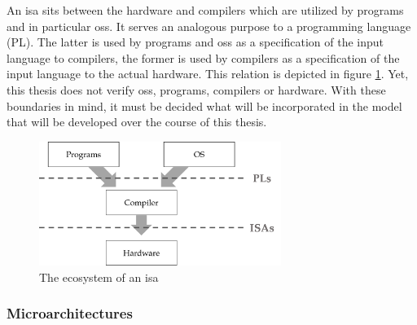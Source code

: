 An \gls{isa} sits between the hardware and compilers which are utilized by programs and in particular \glspl{os}.
It serves an analogous purpose to a programming language (PL).
The latter is used by programs and \glspl{os} as a specification of the input language to compilers, the former is used by compilers as a specification of the input language to the actual hardware.
This relation is depicted in figure \ref{fig:ecosystem}.
Yet, this thesis does not verify \glspl{os}, programs, compilers or hardware.
With these boundaries in mind, it must be decided what will be incorporated in the model that will be developed over the course of this thesis.

\begin{figure}
    \centering
    \includegraphics[width=0.7\textwidth]{figures/stack.png}
    \caption{The ecosystem of an \gls{isa}}
    \label{fig:ecosystem}
\end{figure}

\subsubsection{Microarchitectures}
\label{sec:microarchs}

